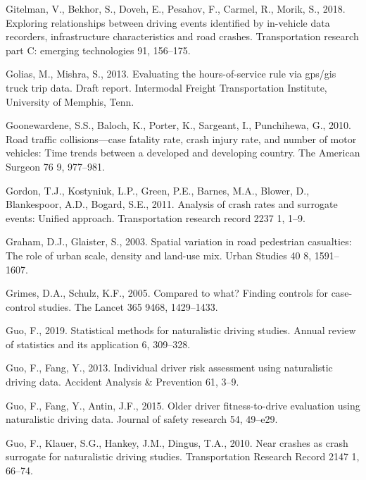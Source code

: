 \documentclass[12pt]{book}
\numberwithin{equation}{chapter}
\begin{document}
\leavevmode\hypertarget{ref-gitelman2018exploring}{}%
Gitelman, V., Bekhor, S., Doveh, E., Pesahov, F., Carmel, R., Morik, S., 2018. Exploring relationships between driving events identified by in-vehicle data recorders, infrastructure characteristics and road crashes. Transportation research part C: emerging technologies 91, 156--175.

\leavevmode\hypertarget{ref-golias2013evaluating}{}%
Golias, M., Mishra, S., 2013. Evaluating the hours-of-service rule via gps/gis truck trip data. Draft report. Intermodal Freight Transportation Institute, University of Memphis, Tenn.

\leavevmode\hypertarget{ref-goonewardene2010road}{}%
Goonewardene, S.S., Baloch, K., Porter, K., Sargeant, I., Punchihewa, G., 2010. Road traffic collisions---case fatality rate, crash injury rate, and number of motor vehicles: Time trends between a developed and developing country. The American Surgeon 76 9, 977--981.

\leavevmode\hypertarget{ref-gordon2011analysis}{}%
Gordon, T.J., Kostyniuk, L.P., Green, P.E., Barnes, M.A., Blower, D., Blankespoor, A.D., Bogard, S.E., 2011. Analysis of crash rates and surrogate events: Unified approach. Transportation research record 2237 1, 1--9.

\leavevmode\hypertarget{ref-graham2003spatial}{}%
Graham, D.J., Glaister, S., 2003. Spatial variation in road pedestrian casualties: The role of urban scale, density and land-use mix. Urban Studies 40 8, 1591--1607.

\leavevmode\hypertarget{ref-grimes2005compared}{}%
Grimes, D.A., Schulz, K.F., 2005. Compared to what? Finding controls for case-control studies. The Lancet 365 9468, 1429--1433.

\leavevmode\hypertarget{ref-guo2019statistical}{}%
Guo, F., 2019. Statistical methods for naturalistic driving studies. Annual review of statistics and its application 6, 309--328.

\leavevmode\hypertarget{ref-guo2013individual}{}%
Guo, F., Fang, Y., 2013. Individual driver risk assessment using naturalistic driving data. Accident Analysis \& Prevention 61, 3--9.

\leavevmode\hypertarget{ref-guo2015older}{}%
Guo, F., Fang, Y., Antin, J.F., 2015. Older driver fitness-to-drive evaluation using naturalistic driving data. Journal of safety research 54, 49--e29.

\leavevmode\hypertarget{ref-guo2010near}{}%
Guo, F., Klauer, S.G., Hankey, J.M., Dingus, T.A., 2010. Near crashes as crash surrogate for naturalistic driving studies. Transportation Research Record 2147 1, 66--74.
\end{document}

